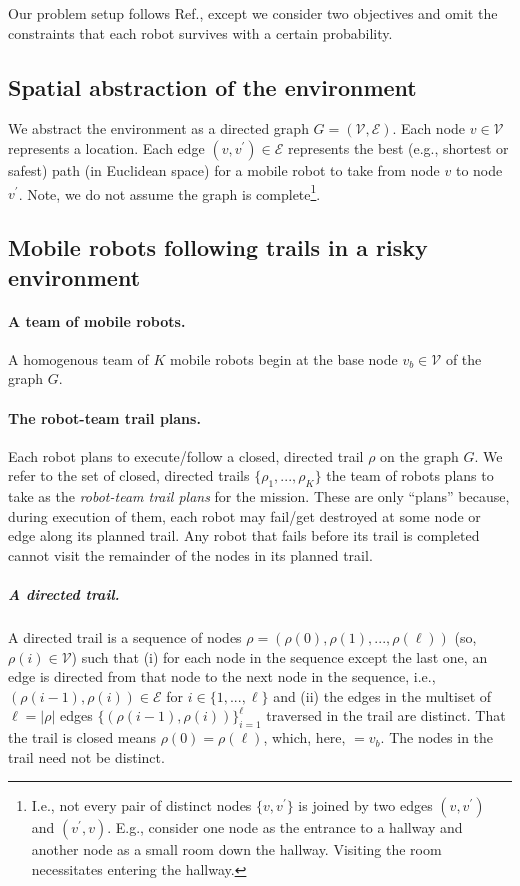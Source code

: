 \documentclass[11pt, oneside]{article}
\begin{document}
Our problem setup follows Ref.\cite{jorgensen2018team}, except we consider two objectives and omit the constraints that each robot survives with a certain probability.

\subsection{Spatial abstraction of the environment}
We abstract the environment as a directed graph $G=(\mathcal{V}, \mathcal{E})$. Each node $v\in \mathcal{V}$ represents a location. Each edge $(v, v^\prime) \in \mathcal{E}$ represents the best (e.g., shortest or safest) path (in Euclidean space) for a mobile robot to take from node $v$ to node $v^\prime$.
Note, we do not assume the graph is complete\footnote{I.e., not every pair of distinct nodes $\{v, v^\prime\}$ is joined by two edges $(v, v^\prime)$ and $(v^\prime, v)$. E.g., consider one node as the entrance to a hallway and another node as a small room down the hallway. Visiting the room necessitates entering the hallway.}.

\subsection{Mobile robots following trails in a risky environment}
\paragraph{A team of mobile robots.} 
A homogenous team of $K$ mobile robots begin at the base node $v_b \in \mathcal{V}$ of the graph $G$. 

\paragraph{The robot-team trail plans.}
Each robot plans to execute/follow a closed, directed trail $\rho$ on the graph $G$.  
We refer to the set of closed, directed trails $\{\rho_1, ..., \rho_K\}$ the team of robots plans to take as the \emph{robot-team trail plans} for the mission.
These are only ``plans'' because, during execution of them, each robot may fail/get destroyed at some node or edge along its planned trail. Any robot that fails before its trail is completed cannot visit the remainder of the nodes in its planned trail.

\subparagraph{A directed trail.} A directed trail is a sequence of nodes $\rho=(\rho(0), \rho(1), ..., \rho(\ell))$ (so, $\rho(i) \in \mathcal{V}$) such that 
(i) for each node in the sequence except the last one, an edge is directed from that node to the next node in the sequence, i.e., $(\rho(i-1), \rho(i))\in\mathcal{E}$ for $i \in \{1, ..., \ell\}$
and 
(ii) the edges in the multiset of $\ell =\lvert \rho \rvert$ edges $\{(\rho(i-1), \rho(i))\}_{i=1}^{\ell}$ traversed in the trail are distinct.
That the trail is closed means $\rho(0)=\rho(\ell)$, which, here, $=v_b$.
The nodes in the trail need not be distinct.
\end{document}
